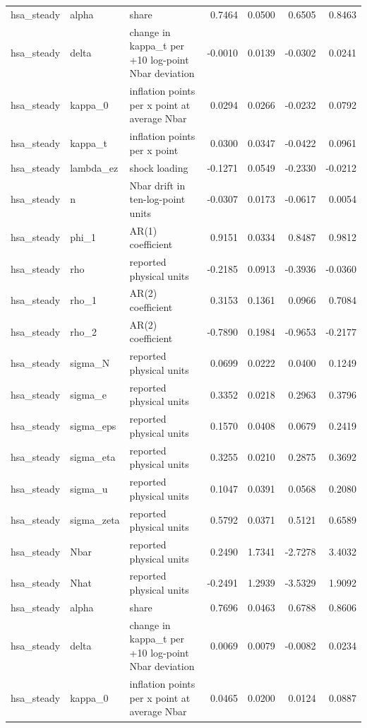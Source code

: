 \begin{tabular}{lllrrrr}
hsa\_steady & alpha & share & 0.7464 & 0.0500 & 0.6505 & 0.8463 \\
hsa\_steady & delta & change in kappa\_t per +10 log-point Nbar deviation & -0.0010 & 0.0139 & -0.0302 & 0.0241 \\
hsa\_steady & kappa\_0 & inflation points per x point at average Nbar & 0.0294 & 0.0266 & -0.0232 & 0.0792 \\
hsa\_steady & kappa\_t & inflation points per x point & 0.0300 & 0.0347 & -0.0422 & 0.0961 \\
hsa\_steady & lambda\_ez & shock loading & -0.1271 & 0.0549 & -0.2330 & -0.0212 \\
hsa\_steady & n & Nbar drift in ten-log-point units & -0.0307 & 0.0173 & -0.0617 & 0.0054 \\
hsa\_steady & phi\_1 & AR(1) coefficient & 0.9151 & 0.0334 & 0.8487 & 0.9812 \\
hsa\_steady & rho & reported physical units & -0.2185 & 0.0913 & -0.3936 & -0.0360 \\
hsa\_steady & rho\_1 & AR(2) coefficient & 0.3153 & 0.1361 & 0.0966 & 0.7084 \\
hsa\_steady & rho\_2 & AR(2) coefficient & -0.7890 & 0.1984 & -0.9653 & -0.2177 \\
hsa\_steady & sigma\_N & reported physical units & 0.0699 & 0.0222 & 0.0400 & 0.1249 \\
hsa\_steady & sigma\_e & reported physical units & 0.3352 & 0.0218 & 0.2963 & 0.3796 \\
hsa\_steady & sigma\_eps & reported physical units & 0.1570 & 0.0408 & 0.0679 & 0.2419 \\
hsa\_steady & sigma\_eta & reported physical units & 0.3255 & 0.0210 & 0.2875 & 0.3692 \\
hsa\_steady & sigma\_u & reported physical units & 0.1047 & 0.0391 & 0.0568 & 0.2080 \\
hsa\_steady & sigma\_zeta & reported physical units & 0.5792 & 0.0371 & 0.5121 & 0.6589 \\
hsa\_steady & Nbar & reported physical units & 0.2490 & 1.7341 & -2.7278 & 3.4032 \\
hsa\_steady & Nhat & reported physical units & -0.2491 & 1.2939 & -3.5329 & 1.9092 \\
hsa\_steady & alpha & share & 0.7696 & 0.0463 & 0.6788 & 0.8606 \\
hsa\_steady & delta & change in kappa\_t per +10 log-point Nbar deviation & 0.0069 & 0.0079 & -0.0082 & 0.0234 \\
hsa\_steady & kappa\_0 & inflation points per x point at average Nbar & 0.0465 & 0.0200 & 0.0124 & 0.0887 \\

\end{tabular}
